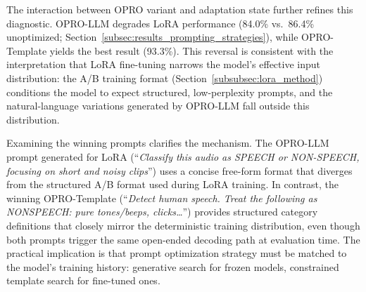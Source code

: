\documentclass[11pt,a4paper]{article}
\begin{document}
The interaction between OPRO variant and adaptation state further refines this diagnostic. OPRO-LLM degrades LoRA performance (84.0\% vs.\ 86.4\% unoptimized; Section~\ref{subsec:results_prompting_strategies}), while OPRO-Template yields the best result (93.3\%). This reversal is consistent with the interpretation that LoRA fine-tuning narrows the model's effective input distribution: the A/B training format (Section~\ref{subsubsec:lora_method}) conditions the model to expect structured, low-perplexity prompts, and the natural-language variations generated by OPRO-LLM fall outside this distribution.

Examining the winning prompts clarifies the mechanism. The OPRO-LLM prompt generated for LoRA (``\textit{Classify this audio as SPEECH or NON-SPEECH, focusing on short and noisy clips}'') uses a concise free-form format that diverges from the structured A/B format used during LoRA training. In contrast, the winning OPRO-Template (``\textit{Detect human speech. Treat the following as NONSPEECH: pure tones/beeps, clicks\ldots}'') provides structured category definitions that closely mirror the deterministic training distribution, even though both prompts trigger the same open-ended decoding path at evaluation time. The practical implication is that prompt optimization strategy must be matched to the model's training history: generative search for frozen models, constrained template search for fine-tuned ones.
\end{document}
